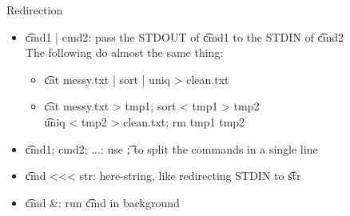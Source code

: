 \begin{frame}[fragile]{Redirection}
\begin{itemize}
\item \t{cmd1 | cmd2}: pass the STDOUT of \t{cmd1} to the STDIN of \t{cmd2}\\
The following do almost the same thing:
\begin{itemize}
\item \t{cat messy.txt | sort | uniq > clean.txt}
\item \t{cat messy.txt > tmp1; sort < tmp1 > tmp2}\\
\t{uniq < tmp2 > clean.txt; rm tmp1 tmp2}
\end{itemize}
\item \t{cmd1; cmd2; ...}: use \t{;} to split the commands in a single line
\item \t{cmd <<< str}: here-string, like redirecting STDIN to \t{str}
\item \t{cmd \&}: run \t{cmd} in background
\end{itemize}
\end{frame}
